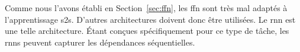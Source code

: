 \section{}
\label{seq:rnn}

Comme nous l'avons établi en Section~\ref{sec:ffn}, 
les \gls{ffn} sont très mal adaptés à l'apprentissage \gls{s2s}.
D'autres architectures doivent donc être utilisées.
Le \gls{rnn} est une telle architecture.
Étant conçues spécifiquement pour ce type de tâche, 
les \glspl{rnn} peuvent capturer les dépendances séquentielles.

